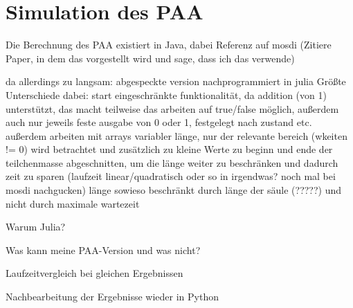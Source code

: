 \section{Simulation des PAA}
Die Berechnung des PAA existiert in Java, dabei Referenz auf mosdi (Zitiere Paper, in dem das vorgestellt wird und sage, dass ich das verwende)

da allerdings zu langsam: abgespeckte version nachprogrammiert in julia
Größte Unterschiede dabei: start eingeschränkte funktionalität, da addition (von 1) unterstützt, das macht teilweise das arbeiten auf true/false möglich, außerdem auch nur jeweils feste ausgabe von 0 oder 1, festgelegt nach zustand etc.
außerdem arbeiten mit arrays variabler länge, nur der relevante bereich (wkeiten != 0) wird betrachtet und zusätzlich zu kleine Werte zu beginn und ende der teilchenmasse abgeschnitten, um die länge weiter zu beschränken und dadurch zeit zu sparen (laufzeit linear/quadratisch oder so in irgendwas? noch mal bei mosdi nachgucken) länge sowieso beschränkt durch länge der säule (?????) und nicht durch maximale wartezeit

Warum Julia? 

Was kann meine PAA-Version und was nicht?

Laufzeitvergleich bei gleichen Ergebnissen

Nachbearbeitung der Ergebnisse wieder in Python



